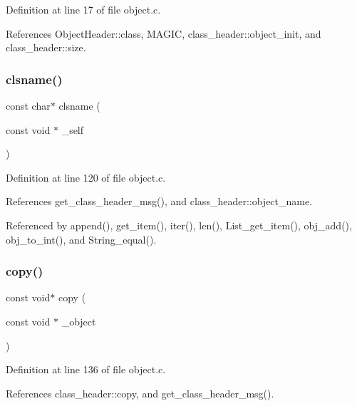Definition at line 17 of file object.\+c.



References Object\+Header\+::class, M\+A\+G\+IC, class\+\_\+header\+::object\+\_\+init, and class\+\_\+header\+::size.

\mbox{\label{group__common_gadcc35aece3f8a4c822a9bf2a591f087b}} 
\subsubsection{\texorpdfstring{clsname()}{clsname()}}
{\footnotesize\ttfamily const char$\ast$ clsname (\begin{DoxyParamCaption}\item[{const void $\ast$}]{\+\_\+self }\end{DoxyParamCaption})}



Definition at line 120 of file object.\+c.



References get\+\_\+class\+\_\+header\+\_\+msg(), and class\+\_\+header\+::object\+\_\+name.



Referenced by append(), get\+\_\+item(), iter(), len(), List\+\_\+get\+\_\+item(), obj\+\_\+add(), obj\+\_\+to\+\_\+int(), and String\+\_\+equal().

\mbox{\label{group__common_gab08ed4d7b5aa115383f38057e006be9d}} 
\subsubsection{\texorpdfstring{copy()}{copy()}}
{\footnotesize\ttfamily const void$\ast$ copy (\begin{DoxyParamCaption}\item[{const void $\ast$}]{\+\_\+object }\end{DoxyParamCaption})}



Definition at line 136 of file object.\+c.



References class\+\_\+header\+::copy, and get\+\_\+class\+\_\+header\+\_\+msg().




